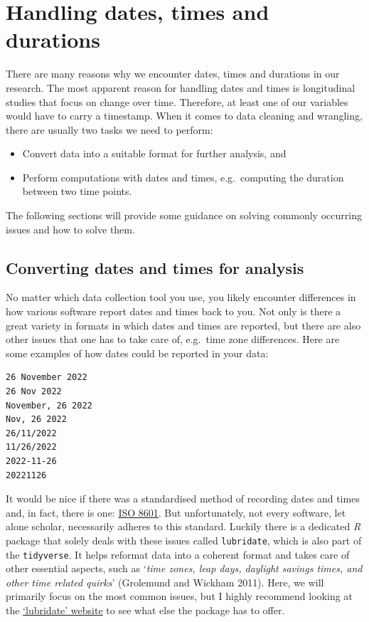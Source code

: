 \documentclass[
  letterpaper,
  DIV=11,
  numbers=noendperiod]{scrreprt}
\begin{document}
\section{Handling dates, times and
durations}\label{sec-handling-dates-times-and-durations}

There are many reasons why we encounter dates, times and durations in
our research. The most apparent reason for handling dates and times is
longitudinal studies that focus on change over time. Therefore, at least
one of our variables would have to carry a timestamp. When it comes to
data cleaning and wrangling, there are usually two tasks we need to
perform:

\begin{itemize}
\item
  Convert data into a suitable format for further analysis, and
\item
  Perform computations with dates and times, e.g.~computing the duration
  between two time points.
\end{itemize}

The following sections will provide some guidance on solving commonly
occurring issues and how to solve them.

\subsection{Converting dates and times for
analysis}\label{sec-converting-dates-and-times-for-analysis}

No matter which data collection tool you use, you likely encounter
differences in how various software report dates and times back to you.
Not only is there a great variety in formats in which dates and times
are reported, but there are also other issues that one has to take care
of, e.g.~time zone differences. Here are some examples of how dates
could be reported in your data:

\begin{verbatim}
26 November 2022
26 Nov 2022
November, 26 2022
Nov, 26 2022
26/11/2022
11/26/2022
2022-11-26
20221126
\end{verbatim}

It would be nice if there was a standardised method of recording dates
and times and, in fact, there is one:
\href{https://www.iso.org/iso-8601-date-and-time-format.html}{ISO 8601}.
But unfortunately, not every software, let alone scholar, necessarily
adheres to this standard. Luckily there is a dedicated \emph{R} package
that solely deals with these issues called \texttt{lubridate}, which is
also part of the \texttt{tidyverse}. It helps reformat data into a
coherent format and takes care of other essential aspects, such as
`\emph{time zones, leap days, daylight savings times, and other time
related quirks}' (Grolemund and Wickham 2011). Here, we will primarily
focus on the most common issues, but I highly recommend looking at the
\href{https://lubridate.tidyverse.org/}{`lubridate' website} to see what
else the package has to offer.
\end{document}
